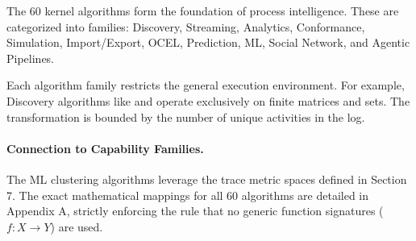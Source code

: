 The 60 kernel algorithms form the foundation of process intelligence. These are categorized into families: Discovery, Streaming, Analytics, Conformance, Simulation, Import/Export, OCEL, Prediction, ML, Social Network, and Agentic Pipelines.

Each algorithm family restricts the general execution environment. For example, Discovery algorithms like  and  operate exclusively on finite matrices and sets. The transformation is bounded by the number of unique activities in the log.

\paragraph{Connection to Capability Families.}
The ML clustering algorithms leverage the trace metric spaces defined in Section 7. The exact mathematical mappings for all 60 algorithms are detailed in Appendix A, strictly enforcing the rule that no generic function signatures ($f: X \to Y$) are used.
